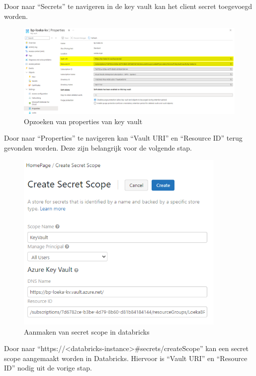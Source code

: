Door naar ``Secrets'' te navigeren in de key vault kan het client secret toegevoegd worden.

\begin{figure}[H]
    \centering
    \includegraphics[width=1\textwidth]{./graphics/databricks/connection_13.png}
    \caption{Opzoeken van properties van key vault}
\end{figure}

Door naar ``Properties'' te navigeren kan ``Vault URI'' en ``Resource ID'' terug gevonden worden. Deze zijn belangrijk voor de volgende stap.

\begin{figure}[H]
    \centering
    \includegraphics[width=0.9\textwidth]{./graphics/databricks/connection_14.png}
    \caption{Aanmaken van secret scope in databricks}
\end{figure}

Door naar ``https://<databricks-instance>\#secrets/createScope'' kan een secret scope aangemaakt worden in Databricks. Hiervoor is ``Vault URI'' en ``Resource ID'' nodig uit de vorige stap.

